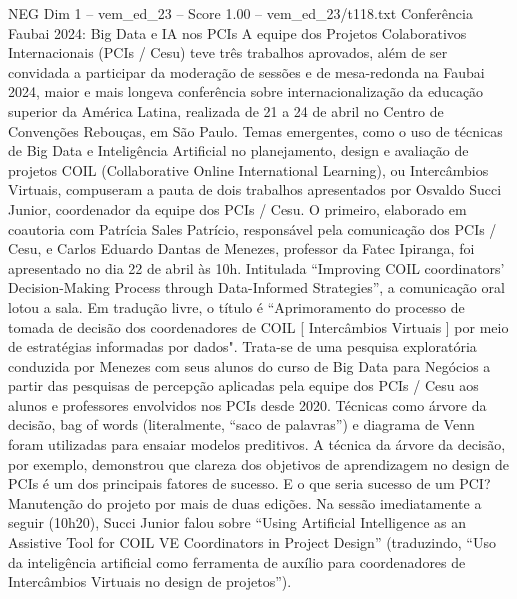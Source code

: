 \begin{textsample}{NEG Dim 1 – vem\_ed\_23 – Score 1.00 – vem\_ed\_23/t118.txt}  \label{ex:f1_neg_076}
Conferência Faubai 2024: Big Data e IA nos PCIs A equipe dos Projetos Colaborativos Internacionais (PCIs / Cesu) teve três trabalhos aprovados, além de ser convidada a participar da moderação de sessões e de mesa-redonda na Faubai 2024, maior e mais longeva conferência sobre internacionalização da educação superior da América Latina, realizada de 21 a 24 de abril no Centro de Convenções Rebouças, em São Paulo.
Temas emergentes, como o uso de técnicas de Big Data e Inteligência Artificial no planejamento, design e avaliação de projetos COIL (Collaborative Online International Learning), ou Intercâmbios Virtuais, compuseram a pauta de dois trabalhos apresentados por Osvaldo Succi Junior, coordenador da equipe dos PCIs / Cesu.
O primeiro, elaborado em coautoria com Patrícia Sales Patrício, responsável pela comunicação dos PCIs / Cesu, e Carlos Eduardo Dantas de Menezes, professor da Fatec Ipiranga, foi apresentado no dia 22 de abril às 10h.
Intitulada “Improving COIL coordinators’ Decision-Making Process through Data-Informed Strategies”, a comunicação oral lotou a sala.
Em tradução livre, o título é “Aprimoramento do processo de tomada de decisão dos coordenadores de COIL [ Intercâmbios Virtuais ] por meio de estratégias informadas por dados".
Trata-se de uma pesquisa exploratória conduzida por Menezes com seus alunos do curso de Big Data para Negócios a partir das pesquisas de percepção aplicadas pela equipe dos PCIs / Cesu aos alunos e professores envolvidos nos PCIs desde 2020.
Técnicas como árvore da decisão, bag of words (literalmente, “saco de palavras”) e diagrama de Venn foram utilizadas para ensaiar modelos preditivos.
A técnica da árvore da decisão, por exemplo, demonstrou que clareza dos objetivos de aprendizagem no design de PCIs é um dos principais fatores de sucesso.
E o que seria sucesso de um PCI?
Manutenção do projeto por mais de duas edições.
Na sessão imediatamente a seguir (10h20), Succi Junior falou sobre “Using Artificial Intelligence as an Assistive Tool for COIL VE Coordinators in Project Design” (traduzindo, “Uso da inteligência artificial como ferramenta de auxílio para coordenadores de Intercâmbios Virtuais no design de projetos”).

\end{textsample}
